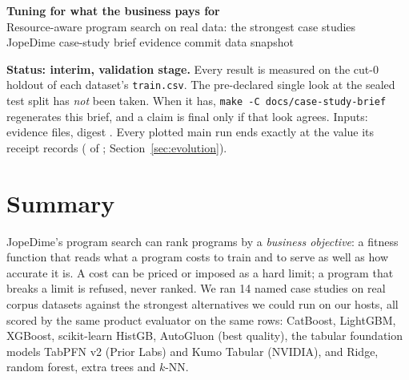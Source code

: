 \documentclass[10.5pt]{article}
\begin{document}
\begin{center}
{\LARGE\bfseries\color{ink} Tuning for what the business pays for}\\[4pt]
{\large\color{ours} Resource-aware program search on real data: the strongest case studies}\\[6pt]
{\small\color{alt} JopeDime \textbullet{} case-study brief \textbullet{} evidence commit \texttt{\BriefEvidenceCommit} \textbullet{} data snapshot \BriefDataStamp}
\end{center}

\begin{status}
\textbf{Status: interim, validation stage.} Every result is measured on the cut-0 holdout of each dataset's
\texttt{train.csv}. The pre-declared single look at the sealed test split has \emph{not} been taken. When it has,
\texttt{make -C docs/case-study-brief} regenerates this brief, and a claim is final only if that look agrees.
Inputs: \BriefInputCount{} evidence files, digest \texttt{\BriefInputsSha}. Every plotted main run ends exactly at the value its receipt records (\EvoMainMatch{} of \EvoMainRuns{}; Section~\ref{sec:evolution}).
\end{status}

\section*{Summary}
JopeDime's program search can rank programs by a \emph{business objective}: a fitness function that reads what a program
costs to train and to serve as well as how accurate it is. A cost can be priced or imposed as a hard limit; a program that
breaks a limit is refused, never ranked. We ran 14 named case studies on real corpus datasets against the strongest
alternatives we could run on our hosts, all scored by the same product evaluator on the same rows: CatBoost, LightGBM,
XGBoost, scikit-learn HistGB, AutoGluon (best quality), the tabular foundation models TabPFN v2 (Prior Labs) and Kumo Tabular
(NVIDIA), and Ridge, random forest, extra trees and $k$-NN.
\end{document}
